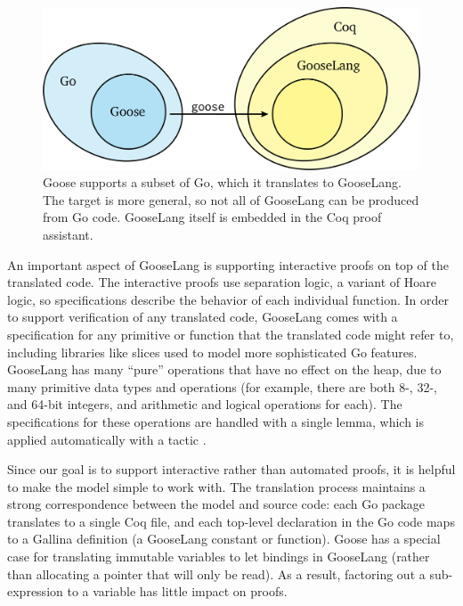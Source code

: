 \begin{figure}
  \includegraphics{fig/goose.png}
  \vspace{0.5\baselineskip}
  \caption{Goose supports a subset of Go, which it translates to GooseLang. The
    target is more general, so not all of GooseLang can be produced from Go
    code. GooseLang itself is embedded in the Coq proof assistant.}
  \label{fig:goose:overview}
\end{figure}

An important aspect of GooseLang is supporting interactive proofs on top
of the translated code. The interactive proofs use separation logic, a
variant of Hoare logic, so specifications describe the behavior of each
individual function. In order to support verification of any translated
code, GooseLang comes with a specification for any primitive or function
that the translated code might refer to, including libraries like slices
used to model more sophisticated Go features. GooseLang has many
``pure'' operations that have no effect on the heap, due to many
primitive data types and operations (for example, there are both 8-,
32-, and 64-bit integers, and arithmetic and logical operations for
each). The specifications for these operations are handled with a single
lemma, which is applied automatically with a tactic .

Since our goal is to support interactive rather than automated proofs,
it is helpful to make the model simple to work with. The translation process maintains
a strong correspondence between the model and source code: each Go
package translates to a single Coq file, and each top-level declaration
in the Go code maps to a Gallina definition (a GooseLang constant or
function). Goose has a special case for translating immutable variables
to let bindings in GooseLang (rather than allocating a pointer that will
only be read). As a result, factoring out a sub-expression to a variable
has little impact on proofs.

